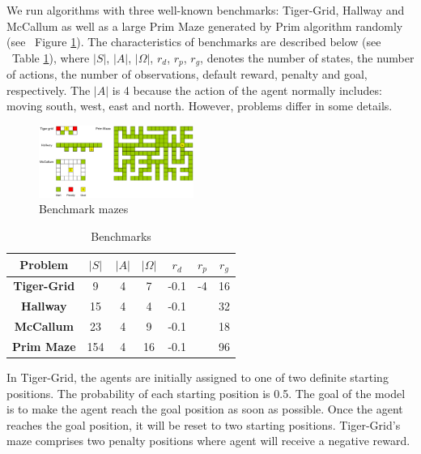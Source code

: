 \documentclass[conference]{IEEEtran}
\begin{document}
	We run algorithms with three well-known benchmarks: Tiger-Grid, Hallway and McCallum 
	as well as a large Prim Maze generated by Prim algorithm randomly
	(see ~Figure \ref{fig:mazes}). The characteristics of benchmarks are described
	below (see ~Table \ref{table:benchmarks}), where $|S|$, $|A|$, $|\Omega|$, $r_d$, $r_p$, $r_g$, 
	denotes the number of states, the number of actions, the number of observations, default
	reward, penalty and goal, respectively. The $|A|$ is 4 because the action of the agent
	normally includes: moving south, west, east and north. However, problems differ in some
	details.
	
	\begin{figure}[htbp]
		\centering
		\includegraphics[width=0.45\textwidth]{mazes.png}
		\caption{Benchmark mazes}
		\label{fig:mazes}
	\end{figure}


\begin{table}[htbp]
	\caption{Benchmarks}
	\begin{center}
		\begin{tabular}{|c|c|c|c|c|c|c|}
			\hline
			\textbf{Problem}&\textbf{$|S|$}&\textbf{$|A|$}&\textbf{$|\Omega|$}&\textbf{$r_d$}&\textbf{$r_p$}&\textbf{$r_g$}	\\
			\hline
			\textbf{Tiger-Grid}&9      & 4              & 7           & -0.1  & -4    & 16  \\
			\textbf{Hallway}         & 15             & 4              & 4           & -0.1  &     & 32  \\
			\textbf{McCallum}       & 23             & 4              & 9           & -0.1  &     & 18  \\
			\textbf{Prim Maze}       & 154            & 4              & 16          & -0.1  &    & 96  \\
			\hline
		\end{tabular}
		\label{table:benchmarks}
	\end{center}
\end{table}

	In Tiger-Grid, the agents are initially assigned to one of two definite starting positions.
	The probability of each starting position is 0.5. The goal of the model is to make the agent
	reach the goal position as soon as possible. Once the agent reaches the goal position,
	it will be reset to two starting positions. Tiger-Grid's maze comprises two penalty positions
	where agent will receive a negative reward. 
	
\end{document}
